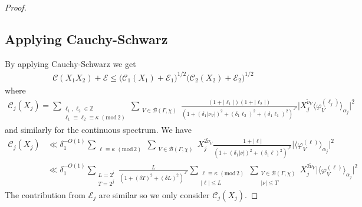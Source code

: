 \documentclass[12pt]{amsart}
\theoremstyle{definition}
\theoremstyle{remark}
\numberwithin{equation}{section}
\newcommand{\Z}{{\mathbb Z}}
\newcommand{\1}{{\mathbf 1}}
\renewcommand{\pmod}[1]{\,\,(\mathrm{mod}\,{#1})}
\begin{document}
\begin{proof}
\subsection{Applying Cauchy-Schwarz}
By applying Cauchy-Schwarz we get
\begin{align*}
    \mathcal{C}(X_1X_2) + \mathcal{E} \leq \bigl(  \mathcal{C}_1(X_1) + \mathcal{E}_1
 \bigr)^{1/2} \bigl(  \mathcal{C}_2(X_2) + \mathcal{E}_2
 \bigr)^{1/2}
\end{align*}
where
\begin{align*}
    \mathcal{C}_j(X_j) = \sum_{\substack{\ell_1,\ell_2 \in \Z \\ \ell_1 \equiv \ell_2 \equiv \kappa \pmod{2}}} \sum_{\substack{V\in \mathcal{B}(\Gamma,\chi) }}  \frac{  (1+|\ell_1|)(1+|\ell_2|)}{(1+(\delta_1|\nu_V|)^2+(\delta_1 \ell_2)^2+(\delta_1 \ell_1)^2)^{J'} }\bigl|X_j^{\widetilde{\nu}_V}\langle\varphi_V^{(\ell_j)}\rangle_{\alpha_j}\bigr|^2
\end{align*}
and similarly for the continuous spectrum. We have
\begin{align*}
       \mathcal{C}_j(X_j) &\ll \delta_1^{-O(1)}  \sum_{\substack{ \ell \equiv \kappa \pmod{2}}} \sum_{\substack{V\in \mathcal{B}(\Gamma,\chi)  }} X_j^{2\widetilde{\nu}_V} \frac{ 1+|\ell|}{(1+(\delta_1|\nu|)^2+(\delta_1 \ell)^2)^{J'} }\bigl|\langle\varphi_V^{(\ell)}\rangle_{\alpha_j}\bigr|^2 \\
      & \ll \delta_1^{-O(1)} \sum_{\substack{L=2^i \\ T=2^j }} \frac{L}{(1+(\delta T)^2+(\delta L)^2)^{J'} } \sum_{\substack{  \ell \equiv \kappa \pmod{2} \\ |\ell| \leq L}} \sum_{\substack{V\in \mathcal{B}(\Gamma,\chi) \\ |\nu| \leq T }} X_j^{2\widetilde{\nu}_V} \bigl|\langle\varphi_V^{(\ell)}\rangle_{\alpha_j}\bigr|^2 
\end{align*}
The contribution from $\mathcal{E}_j$ are similar so we only consider $\mathcal{C}_j(X_j)$.


\end{proof}
\end{document}
